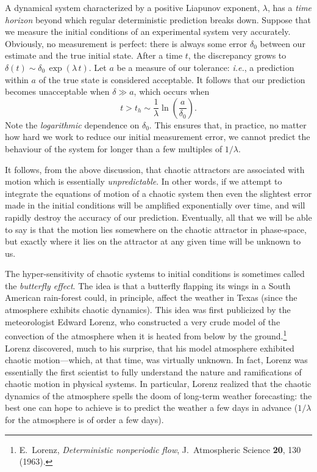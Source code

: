 A dynamical system characterized by a positive Liapunov exponent, $\lambda$,  has a {\em time horizon} beyond
which regular deterministic prediction breaks down. Suppose that we measure the initial
conditions of an experimental system very accurately. Obviously, no measurement is perfect: there
is always some error $\delta_0$ between our estimate and the true initial state. After a
time $t$, the discrepancy grows to $\delta(t)\sim \delta_0\,\exp(\lambda\,t)$. Let $a$ be
a measure of our tolerance: {\em i.e.}, a prediction within $a$ of the true state
is
considered acceptable. It follows that our prediction becomes unacceptable when
$\delta \gg a$, which occurs when
\begin{equation}
t> t_h \sim \frac{1}{\lambda}\ln\!\left(\frac{a}{\delta_0}\right).
\end{equation}
Note the {\em logarithmic}\/ dependence on $\delta_0$. This ensures that, in practice, no matter how
hard we work to reduce our initial measurement error, we cannot predict the behaviour of
the system for longer than a few multiples of $1/\lambda$. 

It follows, from the above discussion, that chaotic attractors are associated with motion which is
essentially {\em unpredictable}. In other words, if we attempt to integrate the equations of
motion of a chaotic system then even the slightest error made in the initial conditions
will be amplified exponentially over time, and will rapidly destroy the accuracy of our prediction. 
Eventually, all that we will be able to say is that the motion lies somewhere on the chaotic attractor
in phase-space, but exactly where it lies on the attractor at any given time will be unknown to
us. 

The hyper-sensitivity of chaotic systems to initial conditions  is
sometimes called the {\em butterfly effect}. The idea is that a butterfly flapping its wings
in a South American rain-forest could, in principle,  affect the weather in Texas (since the atmosphere 
exhibits chaotic dynamics). This idea was first publicized by the meteorologist Edward Lorenz,
who constructed a very crude model of the convection of the atmosphere when it is heated from
below by the ground.\footnote{E.~Lorenz, {\em Deterministic nonperiodic flow}, J.\ Atmospheric
Science {\bf 20}, 130 (1963).}
 Lorenz discovered, much to his surprise, that his model atmosphere exhibited
chaotic motion---which, at that time, was virtually unknown.
 In fact, Lorenz was essentially the first
scientist to fully understand the nature and ramifications of chaotic motion in
physical systems. In particular, Lorenz realized that the chaotic dynamics of the
atmosphere spells the doom of long-term weather forecasting: the best one can hope 
to achieve is
to predict the weather a few days in advance ($1/\lambda$ for the atmosphere is of order a
few days). 

